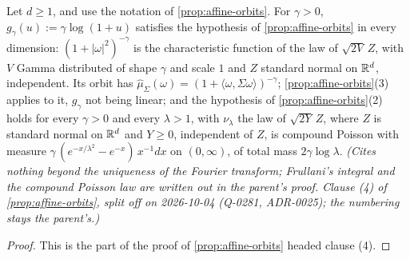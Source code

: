\begin{proposition}
\label{prop:affine-orbits-matern}
\leanok
Let $d \ge 1$, and use the notation of \ref{prop:affine-orbits}. For $\gamma > 0$,
$g_\gamma(u) := \gamma\log(1+u)$ satisfies the hypothesis of \ref{prop:affine-orbits} in every
dimension: $(1+|\omega|^2)^{-\gamma}$ is the characteristic function of the law of $\sqrt{2V}\,Z$, with
$V$ Gamma distributed of shape $\gamma$ and scale $1$ and $Z$ standard normal on $\mathbb{R}^d$, independent.
Its orbit has $\widehat\mu_\Sigma(\omega) = (1 + \langle\omega,\Sigma\omega\rangle)^{-\gamma}$;
\ref{prop:affine-orbits}(3) applies to it, $g_\gamma$ not being linear; and the hypothesis of
\ref{prop:affine-orbits}(2) holds for every $\gamma > 0$ and every $\lambda > 1$, with $\nu_\lambda$
the law of $\sqrt{2Y}\,Z$, where $Z$ is standard normal on $\mathbb{R}^d$ and $Y \ge 0$, independent of $Z$,
is compound Poisson with \Levy{} measure $\gamma\,(e^{-x/\lambda^2} - e^{-x})\,x^{-1}dx$ on
$(0,\infty)$, of total mass $2\gamma\log\lambda$.
\statusT\quad\emph{(Cites nothing beyond the uniqueness of the Fourier transform; Frullani's integral
and the compound Poisson law are written out in the parent's proof. Clause (4) of
\ref{prop:affine-orbits}, split off on 2026-10-04 (Q-0281, ADR-0025); the numbering stays the
parent's.)}
\end{proposition}

\begin{proof}
\leanok
This is the part of the proof of \ref{prop:affine-orbits} headed clause (4).
\end{proof}

